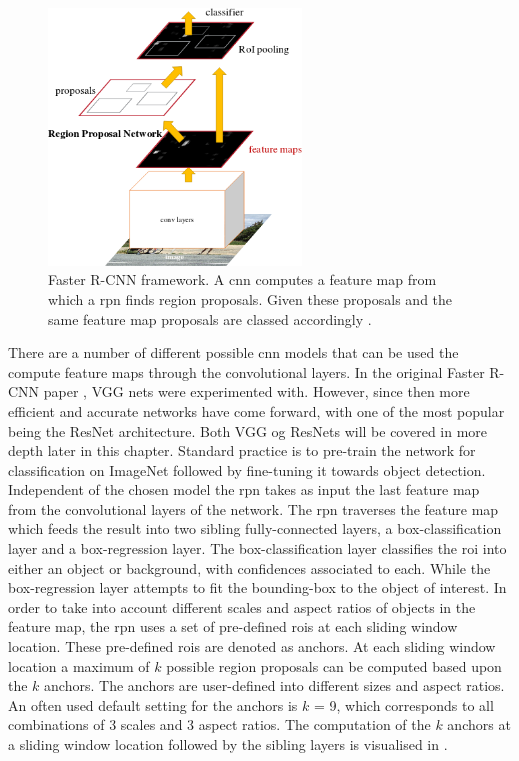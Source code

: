 \begin{figure}[H]
  \centering
    \includegraphics[width=0.6\textwidth]{Figs/Techanal/fasterframework.png}
      \caption{Faster R-CNN framework. A \gls{cnn} computes a feature map from which a \gls{rpn} finds region proposals. Given these proposals and the same feature map proposals are classed accordingly \cite{fasterrcnn}.}
    \label{fig:fasterframework}
\end{figure}

There are a number of different possible \gls{cnn} models that can be used the compute feature maps through the convolutional layers. In the original Faster R-CNN paper \cite{fasterrcnn}, VGG nets \cite{vgg16} were experimented with. However, since then more efficient and accurate networks have come forward, with one of the most popular being the ResNet \cite{deepres} architecture. Both VGG og ResNets will be covered in more depth later in this chapter. Standard practice is to pre-train the network for classification on ImageNet followed by fine-tuning it towards object detection. Independent of the chosen model the \gls{rpn} takes as input the last feature map from the convolutional layers of the network. The \gls{rpn} traverses the feature map which feeds the result into two sibling fully-connected layers, a box-classification layer and a box-regression layer. The box-classification layer classifies the \gls{roi} into either an object or background, with confidences associated to each. While the box-regression layer attempts to fit the bounding-box to the object of interest. In order to take into account different scales and aspect ratios of objects in the feature map, the \gls{rpn} uses a set of pre-defined \glspl{roi} at each sliding window location. These pre-defined \glspl{roi} are denoted as anchors. At each sliding window location a maximum of $k$ possible region proposals can be computed based upon the $k$ anchors. The anchors are user-defined into different sizes and aspect ratios. An often used default setting for the anchors is $k$ = 9, which corresponds to all combinations of 3 scales and 3 aspect ratios. The computation of the $k$ anchors at a sliding window location followed by the sibling layers is visualised in .

